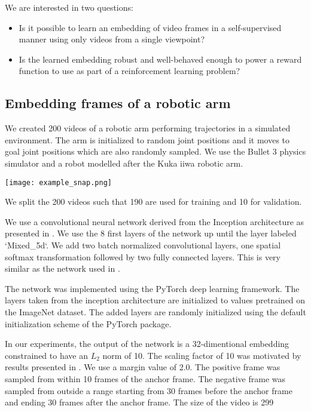 
We are interested in two questions:
\begin{itemize}
\item Is it possible to learn an embedding of video frames in a self-supervised manner using only videos from a single viewpoint?
\item Is the learned embedding robust and well-behaved enough to power a reward function to use as part of a reinforcement learning problem?
\end{itemize}

\subsection{Embedding frames of a robotic arm}

We created 200 videos of a robotic arm performing trajectories in a simulated environment. The arm is initialized to random joint positions and it moves to goal joint positions which are also randomly sampled. We use the Bullet 3 physics simulator and a robot modelled after the Kuka iiwa robotic arm.

{
    \label{example-snap}
    \centering
    \texttt{[image: example\_snap.png]}
    \vspace{0.5cm}
}

We split the 200 videos such that 190 are used for training and 10 for validation.

We use a convolutional neural network derived from the Inception architecture as presented in \citep{inception-v3}. We use the 8 first layers of the network up until the layer labeled `Mixed\_5d`. We add two batch normalized convolutional layers, one spatial softmax transformation followed by two fully connected layers. This is very similar as the network used in \cite{self-supervised-learning}.

The network was implemented using the PyTorch deep learning framework. The layers taken from the inception architecture are initialized to values pretrained on the ImageNet dataset. The added layers are randomly initialized using the default initialization scheme of the PyTorch package.

In our experiments, the output of the network is a 32-dimentional embedding constrained to have an $L_2$ norm of 10. The scaling factor of 10 was motivated by results presented in \cite{constrained-softmax-loss}. We use a margin value of 2.0. The positive frame was sampled from within 10 frames of the anchor frame. The negative frame was sampled from outside a range starting from 30 frames before the anchor frame and ending 30 frames after the anchor frame. The size of the video is 299

